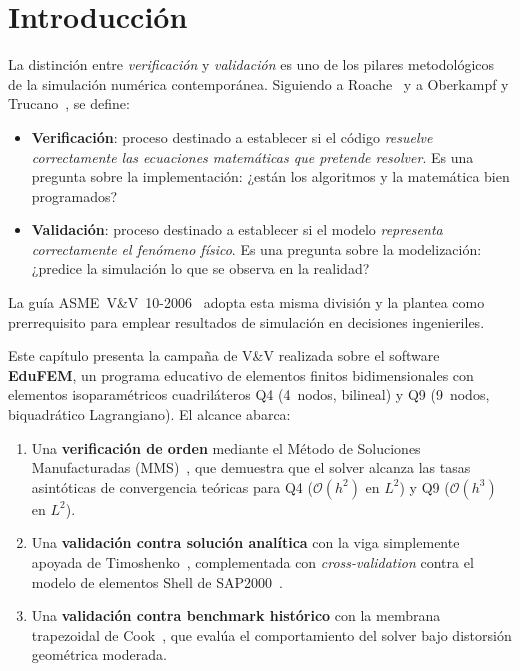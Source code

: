 
\section{Introducción}

La distinción entre \emph{verificación} y \emph{validación} es uno de los pilares
metodológicos de la simulación numérica contemporánea. Siguiendo a
Roache~\cite{roache1998verification} y a Oberkampf y
Trucano~\cite{oberkampf2002verification}, se define:

\begin{itemize}
  \item \textbf{Verificación}: proceso destinado a establecer si el código
        \emph{resuelve correctamente las ecuaciones matemáticas que pretende
        resolver}. Es una pregunta sobre la implementación: ¿están los
        algoritmos y la matemática bien programados?
  \item \textbf{Validación}: proceso destinado a establecer si el modelo
        \emph{representa correctamente el fenómeno físico}. Es una pregunta
        sobre la modelización: ¿predice la simulación lo que se observa en
        la realidad?
\end{itemize}

La guía ASME~V\&V~10-2006~\cite{asme2006vv10} adopta esta misma división y la
plantea como prerrequisito para emplear resultados de simulación en decisiones
ingenieriles.

Este capítulo presenta la campaña de V\&V realizada sobre el software
\textbf{EduFEM}, un programa educativo de elementos finitos
bidimensionales con elementos isoparamétricos cuadriláteros Q4 (4~nodos,
bilineal) y Q9 (9~nodos, biquadrático Lagrangiano). El alcance abarca:

\begin{enumerate}
  \item Una \textbf{verificación de orden} mediante el Método de Soluciones
        Manufacturadas (MMS)~\cite{salari2000mms,roy2005review}, que demuestra
        que el solver alcanza las tasas asintóticas de convergencia teóricas
        para Q4 ($\mathcal{O}(h^2)$ en $L^2$) y Q9 ($\mathcal{O}(h^3)$ en $L^2$).
  \item Una \textbf{validación contra solución analítica} con la viga
        simplemente apoyada de Timoshenko~\cite{timoshenko1970theory},
        complementada con \emph{cross-validation} contra el modelo de
        elementos Shell de SAP2000~\cite{computersandstructures2024sap2000}.
  \item Una \textbf{validación contra benchmark histórico} con la membrana
        trapezoidal de Cook~\cite{cook1974improved}, que evalúa el
        comportamiento del solver bajo distorsión geométrica moderada.
\end{enumerate}


